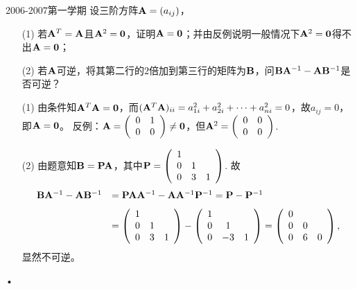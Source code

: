 \begin{frame}
\begin{footnotesize}
\begin{exampleblock}{2006-2007第一学期}
设三阶方阵$\mathbf{A}=(a_{ij})$，
\begin{itemize}
\item[(1)] 若$\mathbf{A}^T=\mathbf{A}$且$\mathbf{A}^2=\mathbf{0}$，证明$\mathbf{A}=\mathbf{0}$；并由反例说明一般情况下$\mathbf{A}^2=\mathbf{0}$得不出$\mathbf{A}=\mathbf{0}$；
\item[(2)]  若$\mathbf{A}$可逆，将其第二行的$2$倍加到第三行的矩阵为$\mathbf{B}$，问$\mathbf{B}\mathbf{A}^{-1}-\mathbf{A}\mathbf{B}^{-1}$是否可逆？
\end{itemize}
\end{exampleblock}
\pause\jiename
\begin{itemize}
\item[(1)]
由条件知$\mathbf{A}^T\mathbf{A}=\mathbf{0}$，而$(\mathbf{A}^T\mathbf{A})_{ii}=a_{1i}^2+a_{2i}^2+\cdots+a_{ni}^2=0$，故$a_{ij}=0$，即$\mathbf{A}=\mathbf{0}$。
反例：$\mathbf{A}=\left(\begin{array}{cc}
0&1\\0&0
\end{array}\right)\ne \mathbf{0}$，但$\mathbf{A}^2=\left(\begin{array}{cc}
0&0\\0&0
\end{array}\right)$. \pause
\item[(2)]
由题意知$\mathbf{B}=\mathbf{P}\mathbf{A}$，其中$\mathbf{P}=\left(\begin{array}{ccc}
1&&\\0&1&\\0&3&1
\end{array}\right)$. 故
$$
\begin{array}{rl}
\mathbf{B}\mathbf{A}^{-1}-\mathbf{A}\mathbf{B}^{-1}&=\mathbf{P}\mathbf{A}\mathbf{A}^{-1}-\mathbf{A}\mathbf{A}^{-1}\mathbf{P}^{-1}=\mathbf{P}-\mathbf{P}^{-1} \\[0.1in]
&=\left(\begin{array}{ccc}
1&&\\0&1&\\0&3&1
\end{array}\right)-\left(\begin{array}{ccc}
1&&\\0&1&\\0&-3&1
\end{array}\right)=\left(\begin{array}{ccc}
0&&\\0&0&\\0&6&0
\end{array}\right),
\end{array}
$$ 显然不可逆。
\end{itemize}•
\end{footnotesize}
\end{frame}

